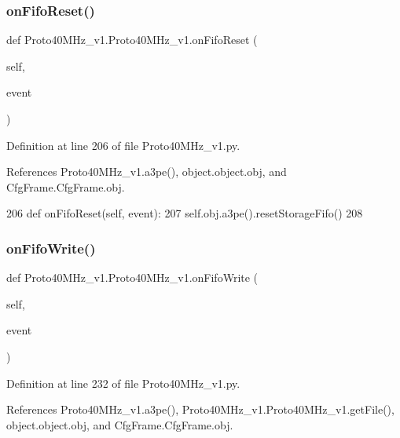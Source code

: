 \subsubsection{\texorpdfstring{on\+Fifo\+Reset()}{onFifoReset()}}
{\footnotesize\ttfamily def Proto40\+M\+Hz\+\_\+v1.\+Proto40\+M\+Hz\+\_\+v1.\+on\+Fifo\+Reset (\begin{DoxyParamCaption}\item[{}]{self,  }\item[{}]{event }\end{DoxyParamCaption})}



Definition at line 206 of file Proto40\+M\+Hz\+\_\+v1.\+py.



References Proto40\+M\+Hz\+\_\+v1.\+a3pe(), object.\+object.\+obj, and Cfg\+Frame.\+Cfg\+Frame.\+obj.


\begin{DoxyCode}
206     \textcolor{keyword}{def }onFifoReset(self, event):
207         self.obj.a3pe().resetStorageFifo()
208 
\end{DoxyCode}
\mbox{\label{classProto40MHz__v1_1_1Proto40MHz__v1_ac3a292f2caf8585e44dd45ce99c6cbf7}} 
\subsubsection{\texorpdfstring{on\+Fifo\+Write()}{onFifoWrite()}}
{\footnotesize\ttfamily def Proto40\+M\+Hz\+\_\+v1.\+Proto40\+M\+Hz\+\_\+v1.\+on\+Fifo\+Write (\begin{DoxyParamCaption}\item[{}]{self,  }\item[{}]{event }\end{DoxyParamCaption})}



Definition at line 232 of file Proto40\+M\+Hz\+\_\+v1.\+py.



References Proto40\+M\+Hz\+\_\+v1.\+a3pe(), Proto40\+M\+Hz\+\_\+v1.\+Proto40\+M\+Hz\+\_\+v1.\+get\+File(), object.\+object.\+obj, and Cfg\+Frame.\+Cfg\+Frame.\+obj.


